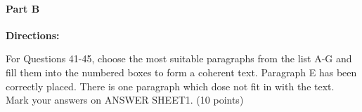 \paragraph{Part B}

\textbf{Directions:}

For Questions 41-45, choose the most suitable paragraphs from the list A-G and fill them into the numbered boxes to form a coherent text. Paragraph E has been correctly placed. There is one paragraph which dose not fit in with the text. Mark your answers on ANSWER SHEET1. (10 points)

\vspace{6pt}
